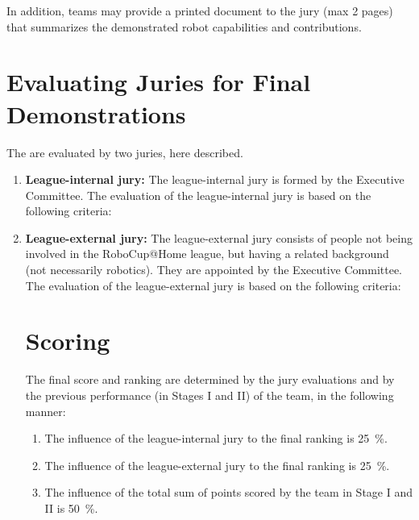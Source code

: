 In addition, teams may provide a printed document to the jury (max 2 pages) that summarizes the demonstrated robot capabilities and contributions.  


\section{Evaluating Juries for Final Demonstrations}
The  are evaluated by two juries, here described.

\begin{enumerate}
\item\textbf{League-internal jury:} The league-internal jury is formed by the Executive Committee. The evaluation of the league-internal jury is based on the following criteria:

\item \textbf{League-external jury:} The league-external jury consists of people not being involved in the RoboCup@Home league, but having a related background (not necessarily robotics). They are appointed by the Executive Committee. The evaluation of the league-external jury is based on the following criteria:

\section{Scoring}
The final score and ranking are determined by the jury evaluations and by the previous performance (in Stages I and II) of the team, in the following manner:
  
\begin{enumerate}
  \item The influence of the league-internal jury to the final ranking is \SI{25}{\percent}.
  \item The influence of the league-external jury to the final ranking is \SI{25}{\percent}.
  \item The influence of the total sum of points scored by the team in Stage I and II is \SI{50}{\percent}.
\end{enumerate}


\end{enumerate}
